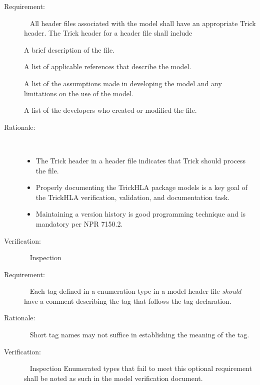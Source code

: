 \documentclass[twoside,11pt,titlepage]{report}
\begin{document}
\label{reqt:h_trick_header}
\begin{description}
  \item[Requirement:]\ \newline
    All header files associated with the model shall have an appropriate
    Trick header. The Trick header for a header file shall include

    \label{reqt:h_trick_header_purpose}
      A brief description of the file.

    \label{reqt:h_trick_header_refs}
      A list of applicable references that describe the model.

    \label{reqt:h_trick_header_assum}
      A list of the assumptions made in developing the model and
      any limitations on the use of the model.

    \label{reqt:h_trick_header_prog}
      A list of the developers who created or modified the file.

  \item[Rationale:]\ \\[-20pt]
    \begin{itemize}
      \item The Trick header in a header file
        indicates that Trick should process the file.
      \item Properly documenting the TrickHLA package models
        is a key goal of the TrickHLA verification,
        validation, and documentation task.
      \item Maintaining a version history is good programming
        technique and is mandatory per NPR 7150.2.
    \end{itemize}

  \item[Verification:]\ \newline
    Inspection
\end{description}

\label{reqt:enum_trick_comments}
\begin{description}
  \item[Requirement:]\ \newline
    Each tag defined in a enumeration type in a model header
    file {\em should} have a comment describing the tag that follows
    the tag declaration.

  \item[Rationale:]\ \newline
    Short tag names may not suffice in establishing
    the meaning of the tag.

  \item[Verification:]\ \newline
    Inspection \newline
    Enumerated types that fail to meet this optional requirement
    shall be noted as such in the model verification document.
\end{description}
\end{document}
